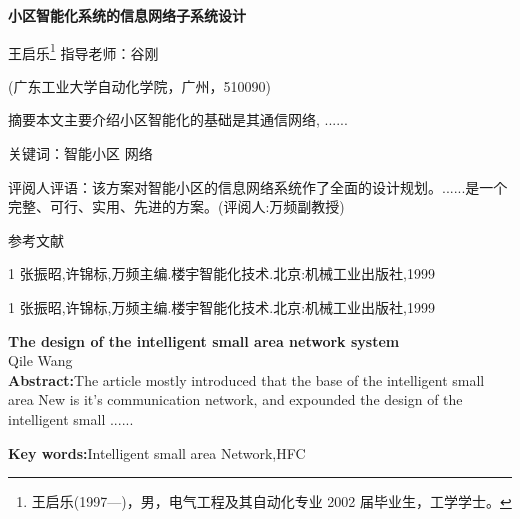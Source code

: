 \documentclass[openright, twoside]{gdutthesis-excellent}
\def\title{小区智能化系统的信息网络子系统设计}
\def\name{王启乐}
\def\footnotetext{王启乐(1997—)，男，电气工程及其自动化专业 2002 届毕业生，工学学士。}
\def\conductor{谷\quad 刚}
\begin{document}
\renewcommand{\baselinestretch}{1.5}
{\centering
\vspace*{20pt}
\bfseries
\title\par
\vspace*{16pt}
\normalfont {}\kaishu
  \name\footnote{\footnotetext} \quad\quad 指导老师：\conductor\par
  (广东工业大学自动化学院，广州，510090)\par

}

\begin{flushleft}
\setlength\leftskip{2em}
\setlength\rightskip{2em}
\renewcommand{\baselinestretch}{1.46}
\setlength{\parindent}{4em}
\kaishu{}
{\quad\quad\heiticu 摘\quad 要}本文主要介绍小区智能化的基础是其通信网络, ......\par
{\heiticu 关键词：}智能小区 网络\par
{\heiticu 评阅人评语：}该方案对智能小区的信息网络系统作了全面的设计规划。......是一个完整、可行、实用、先进的方案。(评阅人:万频副教授)\par
\end{flushleft}

\setlength\leftskip{2em}
\setlength\rightskip{2em}

\normalfont 


\setlength{\baselineskip}{10pt}
\renewcommand{\baselinestretch}{1}
\begin{center}
\heiticu 参考文献
\end{center}

\renewcommand{\baselinestretch}{1.2}
\kaishu
\setlength{\parindent}{0em}
1 张振昭,许锦标,万频主编.楼宇智能化技术.北京:机械工业出版社,1999\par
1 张振昭,许锦标,万频主编.楼宇智能化技术.北京:机械工业出版社,1999\par

\vspace{36pt}

\renewcommand{\baselinestretch}{1}
{
\centering
{}\textbf{The design of the intelligent small area network system}\\
 Qile Wang\\
}
\textbf{Abstract:}The article mostly introduced that the base of the intelligent small area New is it's communication network, and expounded the design of the intelligent small ......\par
\textbf{Key words:}Intelligent small area Network,HFC\par
\end{document}
